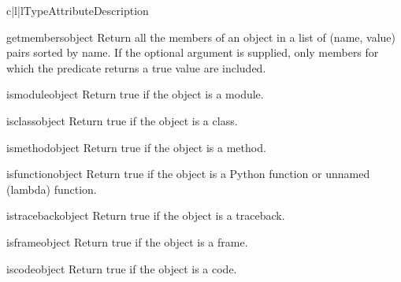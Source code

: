 \begin{tableiii}{c|l|l}{}{Type}{Attribute}{Description}
  \hline
\end{tableiii}

\begin{funcdesc}{getmembers}{object}
  Return all the members of an object in a list of (name, value) pairs
  sorted by name.  If the optional  argument is supplied,
  only members for which the predicate returns a true value are included.
\end{funcdesc}

\begin{funcdesc}{ismodule}{object}
  Return true if the object is a module.
\end{funcdesc}

\begin{funcdesc}{isclass}{object}
  Return true if the object is a class.
\end{funcdesc}

\begin{funcdesc}{ismethod}{object}
  Return true if the object is a method.
\end{funcdesc}

\begin{funcdesc}{isfunction}{object}
  Return true if the object is a Python function or unnamed (lambda) function.
\end{funcdesc}

\begin{funcdesc}{istraceback}{object}
  Return true if the object is a traceback.
\end{funcdesc}

\begin{funcdesc}{isframe}{object}
  Return true if the object is a frame.
\end{funcdesc}

\begin{funcdesc}{iscode}{object}
  Return true if the object is a code.
\end{funcdesc}

